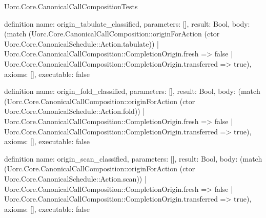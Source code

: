 \begin{lexlean}{Uorc.Core.CanonicalCallCompositionTests}
\begin{semanticmodule}
definition{
  name: origin_tabulate_classified,
  parameters: [],
  result: Bool,
  body: (match (Uorc.Core.CanonicalCallComposition::originForAction (ctor Uorc.Core.CanonicalSchedule::Action.tabulate))
    | Uorc.Core.CanonicalCallComposition::CompletionOrigin.fresh => false
    | Uorc.Core.CanonicalCallComposition::CompletionOrigin.transferred => true),
  axioms: [],
  executable: false
}

definition{
  name: origin_fold_classified,
  parameters: [],
  result: Bool,
  body: (match (Uorc.Core.CanonicalCallComposition::originForAction (ctor Uorc.Core.CanonicalSchedule::Action.fold))
    | Uorc.Core.CanonicalCallComposition::CompletionOrigin.fresh => false
    | Uorc.Core.CanonicalCallComposition::CompletionOrigin.transferred => true),
  axioms: [],
  executable: false
}

definition{
  name: origin_scan_classified,
  parameters: [],
  result: Bool,
  body: (match (Uorc.Core.CanonicalCallComposition::originForAction (ctor Uorc.Core.CanonicalSchedule::Action.scan))
    | Uorc.Core.CanonicalCallComposition::CompletionOrigin.fresh => false
    | Uorc.Core.CanonicalCallComposition::CompletionOrigin.transferred => true),
  axioms: [],
  executable: false
}


\end{semanticmodule}
\end{lexlean}
